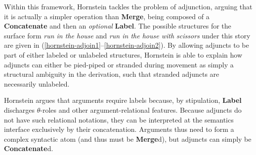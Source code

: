 \documentclass{article}
\begin{document}
\begin{exe}
\end{exe}

Within this framework, Hornstein tackles the problem of adjunction,
arguing that it is actually a simpler operation than \textbf{Merge},
being composed of a \textbf{Concatenate} and then an \emph{optional}
\textbf{Label}.  The possible structures for the surface form
\textit{run in the house} and \textit{run in the house with scissors}
under this story are given in
(\ref{hornstein-adjoin1}--\ref{hornstein-adjoin2}).  By allowing
adjuncts to be part of either labeled or unlabeled structures,
Hornstein is able to explain how adjuncts can either be pied-piped or
stranded during movement as simply a structural ambiguity in the
derivation, such that stranded adjuncts are necessarily unlabeled.

\begin{exe}
\end{exe}

Hornstein argues that arguments require labels because, by
stipulation, \textbf{Label} discharges $\theta$-roles and other
argument-relational features.  Because adjuncts do not have such
relational notations, they can be interpreted at the semantics
interface exclusively by their concatenation.  Arguments thus need to
form a complex syntactic atom (and thus must be \textbf{Merge}d), but
adjuncts can simply be \textbf{Concatenate}d.
\end{document}
